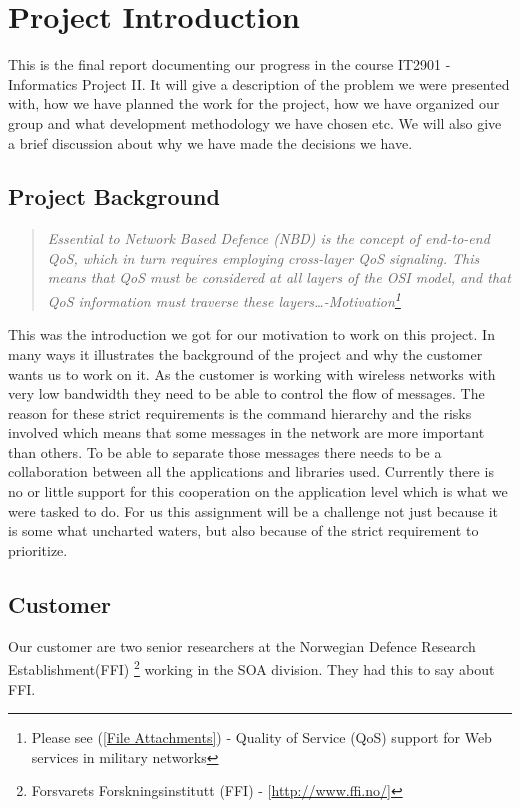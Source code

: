 \section{Project Introduction}\label{Project Introduction}
    This is the final report documenting our progress in the course IT2901 - Informatics Project II. It will give a description of the problem we were presented with, how we have planned the work for the project, how we have organized our group and what development methodology we have chosen etc. We will also give a brief discussion about why we have made the decisions we have.
    
    \subsection{Project Background}\label{Project Background}
    \begin{quotation}
    \em Essential to Network Based Defence (NBD) is the concept of end-to-end QoS, which in turn requires employing cross-layer QoS signaling. This means that QoS must be considered at all layers of the OSI model, and that QoS information must traverse these layers\ldots \textnormal{-Motivation\footnote{Please see (\ref{File Attachments}) - Quality of Service (QoS) support for Web services in military networks}}
    \end{quotation}
    This was the introduction we got for our motivation to work on this project. In many ways it illustrates the background of the project and why the customer wants us to work on it. As the customer is working with wireless networks with very low bandwidth they need to be able to control the flow of messages. The reason for these strict requirements is the command hierarchy and the risks involved which means that some messages in the network are more important than others. To be able to separate those messages there needs to be a collaboration between all the applications and libraries used. Currently there is no or little support for this cooperation on the application level which is what we were tasked to do. For us this assignment will be a challenge not just because it is some what uncharted waters, but also because of the strict requirement to prioritize.

    \subsection{Customer}\label{Customer}
    Our customer are two senior researchers at the Norwegian Defence Research Establishment(FFI)    \footnote{Forsvarets Forskningsinstitutt (FFI) - [\url{http://www.ffi.no/}]} working in the SOA division. They had this to say about FFI.

